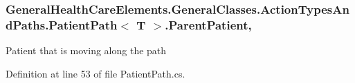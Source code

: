 \subsubsection[{\texorpdfstring{Parent\+Patient}{ParentPatient}}]{ {\bf General\+Health\+Care\+Elements.\+General\+Classes.\+Action\+Types\+And\+Paths.\+Patient\+Path}$<$ T $>$.Parent\+Patient\hspace{0.3cm}{\ttfamily [get]}, {\ttfamily [set]}}\hypertarget{class_general_health_care_elements_1_1_general_classes_1_1_action_types_and_paths_1_1_patient_path_ad46aa5d47c3466188281267bc4db9475}{}\label{class_general_health_care_elements_1_1_general_classes_1_1_action_types_and_paths_1_1_patient_path_ad46aa5d47c3466188281267bc4db9475}


Patient that is moving along the path 



Definition at line 53 of file Patient\+Path.\+cs.

